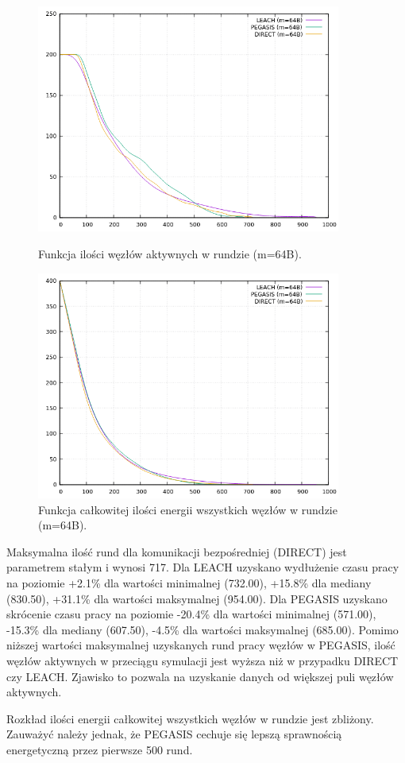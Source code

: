 \documentclass[a4paper,12pt,twoside,openany]{report}
\begin{document}
\begin{figure}[H]
 \centering
 \includegraphics[width=10cm]{images/gnuplot/test_1/nodes_in_round_m64.png}
 \caption{Funkcja ilości węzłów aktywnych w rundzie (m=64B).}
 \includegraphics[width=10cm]{images/gnuplot/test_1/energy_in_round_m64.png}
 \caption{Funkcja całkowitej ilości energii wszystkich węzłów w rundzie (m=64B).}
\end{figure}

\par
Maksymalna ilość rund dla komunikacji bezpośredniej (DIRECT) jest parametrem stałym i wynosi 717.
Dla LEACH uzyskano wydłużenie czasu pracy na poziomie +2.1\% dla wartości minimalnej (732.00), +15.8\% dla mediany (830.50), +31.1\% dla wartości maksymalnej (954.00).
Dla PEGASIS uzyskano skrócenie czasu pracy na poziomie -20.4\% dla wartości minimalnej (571.00), -15.3\% dla mediany (607.50), -4.5\% dla wartości maksymalnej (685.00).
Pomimo niższej wartości maksymalnej uzyskanych rund pracy węzłów w PEGASIS, ilość węzłów aktywnych w przeciągu symulacji jest wyższa niż w przypadku DIRECT czy LEACH.
Zjawisko to pozwala na uzyskanie danych od większej puli węzłów aktywnych.
\par
Rozkład ilości energii całkowitej wszystkich węzłów w rundzie jest zbliżony.
Zauważyć należy jednak, że PEGASIS cechuje się lepszą sprawnością energetyczną przez pierwsze 500 rund. 
\end{document}
